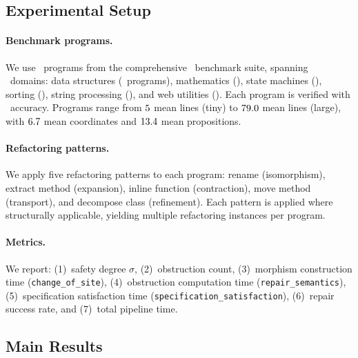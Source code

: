 \documentclass[11pt]{article}
\newcommand{\ChangeOfSite}{\texttt{change\_of\_site}}
\newcommand{\RepairSem}{\texttt{repair\_semantics}}
\newcommand{\SpecSat}{\texttt{specification\_satisfaction}}
\newcommand{\SafeDeg}{\sigma}                        %
\begin{document}
\subsection{Experimental Setup}\label{ssec:eval-setup}

\paragraph{Benchmark programs.}
We use \compTotalPrograms\ programs from the comprehensive \JuGeo\
benchmark suite, spanning \expDomainCount\ domains: data structures
(\expDomainDsCount\ programs), mathematics (\expDomainMathCount),
state machines (\expDomainSmCount), sorting (\expDomainSortCount),
string processing (\expDomainStrCount), and web utilities
(\expDomainWebCount).  Each program is verified with
\compOverallAccuracy\ accuracy.  Programs range from $5$
mean lines (tiny) to $79.0$ mean lines (large), with
$6.7$ mean coordinates and $13.4$ mean propositions.

\paragraph{Refactoring patterns.}
We apply five refactoring patterns to each program: rename (isomorphism),
extract method (expansion), inline function (contraction), move method
(transport), and decompose class (refinement).  Each pattern is applied
where structurally applicable, yielding multiple refactoring instances
per program.

\paragraph{Metrics.}
We report: (1)~safety degree $\SafeDeg$, (2)~obstruction count,
(3)~morphism construction time (\ChangeOfSite), (4)~obstruction
computation time (\RepairSem), (5)~specification satisfaction time
(\SpecSat), (6)~repair success rate, and (7)~total pipeline time.

\subsection{Main Results}\label{ssec:main-results}
\end{document}
